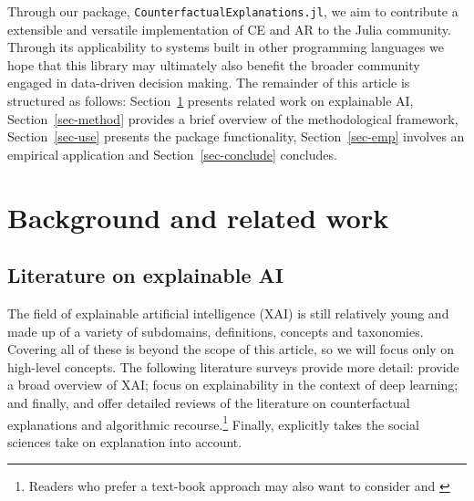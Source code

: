 \documentclass{juliacon}
\begin{document}
Through our package, \texttt{CounterfactualExplanations.jl}, we aim to
contribute a extensible and versatile implementation of CE and AR to the
Julia community. Through its applicability to systems built in other
programming languages we hope that this library may ultimately also
benefit the broader community engaged in data-driven decision making.
The remainder of this article is structured as follows:
Section~\ref{sec-related} presents related work on explainable AI,
Section~\ref{sec-method} provides a brief overview of the methodological
framework, Section~\ref{sec-use} presents the package functionality,
Section~\ref{sec-emp} involves an empirical application and
Section~\ref{sec-conclude} concludes.

\hypertarget{sec-related}{%
\section{Background and related work}\label{sec-related}}

\hypertarget{literature-on-explainable-ai}{%
\subsection{Literature on explainable
AI}\label{literature-on-explainable-ai}}

The field of explainable artificial intelligence (XAI) is still
relatively young and made up of a variety of subdomains, definitions,
concepts and taxonomies. Covering all of these is beyond the scope of
this article, so we will focus only on high-level concepts. The
following literature surveys provide more detail:
\cite{arrieta2020explainable} provide a broad overview of XAI;
\cite{fan2020interpretability} focus on explainability in the context of
deep learning; and finally, \cite{karimi2020survey} and
\cite{verma2020counterfactual} offer detailed reviews of the literature
on counterfactual explanations and algorithmic recourse.\footnote{Readers
  who prefer a text-book approach may also want to consider
  \cite{molnar2020interpretable} and \cite{varshney2022trustworthy}}
Finally, \cite{miller2019explanation} explicitly takes the social
sciences take on explanation into account.
\end{document}
